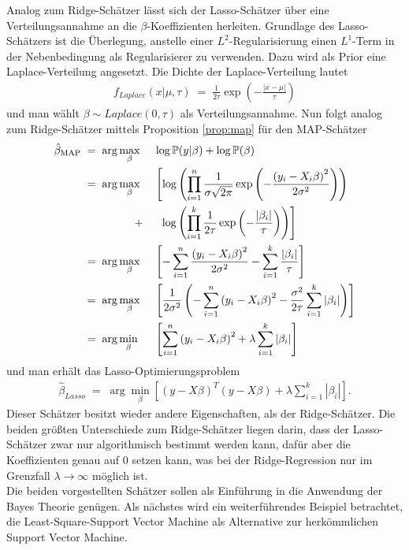 Analog zum Ridge-Schätzer lässt sich der Lasso-Schätzer über eine Verteilungsannahme an die \(\beta\)-Koeffizienten herleiten. Grundlage des Lasso-Schätzers ist die Überlegung, anstelle einer \(L^2\)-Regularisierung einen \(L^1\)-Term in der Nebenbedingung als Regularisierer zu verwenden. Dazu wird als Prior eine Laplace-Verteilung angesetzt. Die Dichte der Laplace-Verteilung lautet
\begin{align*}
	f_{Laplace}(x|\mu,\tau)\;=\;\frac{1}{2\tau}\exp\left(-\frac{\left|x-\mu\right|}{\tau}\right)
\end{align*}
und man wählt \(\beta\sim Laplace(0, \tau)\) als Verteilungsannahme. Nun folgt analog zum Ridge-Schätzer mittels Proposition \autoref{prop:map} für den MAP-Schätzer
\begin{alignat*}{2}
	\hat{\beta}_{\text{MAP}}&\;=\;\arg\underset{\beta}{\max}&& \log\mathbb{P}(y\vert \beta) + \log \mathbb{P}(\beta) \\
	&\;=\;\arg\underset{\beta}{\max}&&\left[\log\left(\prod_{i=1}^{n}\frac{1}{\sigma\sqrt{2\pi}}\exp\left(-\frac{\left(y_i-X_i\beta\right)^2}{2\sigma^2}\right)\right)\right.\\	&\hspace{1,7cm}+&&\:\:\left.\log\left(\prod_{i=1}^{k}\frac{1}{2\tau}\exp\left(-\frac{\left|\beta_i\right|}{\tau}\right)\right)\right]\\
	&\;=\;\arg\underset{\beta}{\max} && \left[-\sum_{i=1}^{n}\frac{\left(y_i-X_i\beta\right)^2}{2\sigma^2}-\sum_{i=1}^{k}\frac{\left|\beta_i\right|}{\tau}\right]\\
	&\;=\;\arg\underset{\beta}{\max} && \left[\frac{1}{2\sigma^2}\left(-\sum_{i=1}^{n}\left(y_i-X_i\beta\right)^2-\frac{\sigma^2}{2\tau}\sum_{i=1}^{k}\left|\beta_i\right|\right)\right]\\
	&\;=\;\arg\underset{\beta}{\min} && \left[\sum_{i=1}^{n}\left(y_i-X_i\beta\right)^2+\lambda\sum_{i=1}^{k}\left|\beta_i\right|\right]
\end{alignat*}
und man erhält das Lasso-Optimierungsproblem
\begin{align*}
	\hat{\beta}_{Lasso}\;=\;\arg\underset{\beta}{\min}\left[\left(y-X\beta\right)^T\left(y-X\beta\right)+\lambda\sum_{i=1}^{k}\left|\beta_i\right|\right].
\end{align*}
Dieser Schätzer besitzt wieder andere Eigenschaften, als der Ridge-Schätzer. Die beiden größten Unterschiede zum Ridge-Schätzer liegen darin, dass der Lasso-Schätzer zwar nur algorithmisch bestimmt werden kann, dafür aber die Koeffizienten genau auf 0 setzen kann, was bei der Ridge-Regression nur im Grenzfall \(\lambda\rightarrow\infty\) möglich ist.\\[0,3cm]
Die beiden vorgestellten Schätzer sollen als Einführung in die Anwendung der Bayes Theorie genügen. Als nächstes wird ein weiterführendes Beispiel betrachtet, die Least-Square-Support Vector Machine als Alternative zur herkömmlichen Support Vector Machine.
